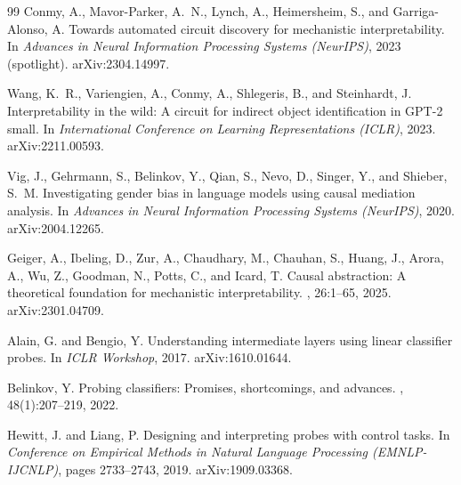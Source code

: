 \documentclass[11pt]{article}
\begin{document}
\begin{thebibliography}{99}
Conmy, A., Mavor-Parker, A.~N., Lynch, A., Heimersheim, S., and
Garriga-Alonso, A.
\newblock Towards automated circuit discovery for mechanistic
interpretability.
\newblock In {\em Advances in Neural Information Processing Systems
(NeurIPS)}, 2023 (spotlight). arXiv:2304.14997.

Wang, K.~R., Variengien, A., Conmy, A., Shlegeris, B., and Steinhardt, J.
\newblock Interpretability in the wild: A circuit for indirect object
identification in {GPT-2 small}.
\newblock In {\em International Conference on Learning Representations
(ICLR)}, 2023. arXiv:2211.00593.

Vig, J., Gehrmann, S., Belinkov, Y., Qian, S., Nevo, D., Singer, Y., and
Shieber, S.~M.
\newblock Investigating gender bias in language models using causal
mediation analysis.
\newblock In {\em Advances in Neural Information Processing Systems
(NeurIPS)}, 2020. arXiv:2004.12265.

Geiger, A., Ibeling, D., Zur, A., Chaudhary, M., Chauhan, S., Huang, J.,
Arora, A., Wu, Z., Goodman, N., Potts, C., and Icard, T.
\newblock Causal abstraction: A theoretical foundation for mechanistic
interpretability.
, 26:1--65, 2025.
arXiv:2301.04709.


Alain, G. and Bengio, Y.
\newblock Understanding intermediate layers using linear classifier probes.
\newblock In {\em ICLR Workshop}, 2017. arXiv:1610.01644.

Belinkov, Y.
\newblock Probing classifiers: Promises, shortcomings, and advances.
, 48(1):207--219, 2022.

Hewitt, J. and Liang, P.
\newblock Designing and interpreting probes with control tasks.
\newblock In {\em Conference on Empirical Methods in Natural Language
Processing (EMNLP-IJCNLP)}, pages 2733--2743, 2019.
arXiv:1909.03368.

\end{thebibliography}
\end{document}
